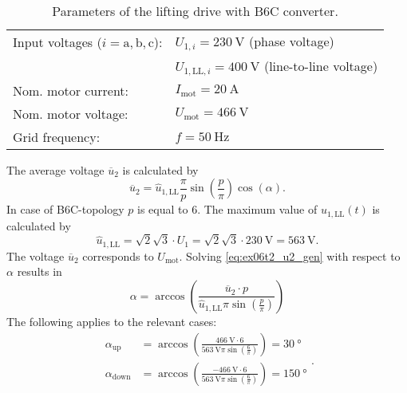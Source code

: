 \begin{table}[ht]
    \centering  %
    \begin{tabular}{ll}
        \toprule
        Input voltages ($i=\mathrm{a,b,c}$): & $U_{\mathrm{1},i}=\SI{230}{\volt}$ (phase voltage) \\
                        & $U_{\mathrm{1,LL},i} = \SI{400}{\volt}$ (line-to-line voltage)\\
        Nom. motor current: & $I_{\mathrm{mot}} = \SI{20}{\ampere}$ \\
        Nom. motor voltage: & $U_\mathrm{mot} = \SI{466}{\volt}$ \\ 
        Grid frequency: & $f= \SI{50}{\hertz}$ \\ 
        \bottomrule
    \end{tabular}
    \caption{Parameters of the lifting drive with B6C converter.}  
    \label{table:ex06_Task2_ParametersOfTheCircuit}
\end{table}


\begin{solutionblock}
    The average voltage $\overline{u}_\mathrm{2}$ is calculated by
    \begin{equation} 
        \overline{u}_\mathrm{2} = \hat{u}_\mathrm{1,LL} \frac{\pi}{p}\sin(\frac{p}{\pi}) \cos(\alpha).
        \label{eq:ex06t2_u2_gen}
    \end{equation}
    In case of B6C-topology $p$ is equal to 6. The maximum value of $u_\mathrm{1,LL}(t)$ is calculated by
    \begin{equation} 
        \hat{u}_\mathrm{1,LL}=\sqrt{2} \sqrt{3} \cdot U_\mathrm{1}= \sqrt{2} \sqrt{3} \cdot \SI{230}{\volt}=\SI{563}{\volt}.
        \label{eq:ex06t2_u1n_max}
    \end{equation}
    The voltage $\overline{u}_\mathrm{2}$ corresponds to $U_\mathrm{mot}$. Solving \eqref{eq:ex06t2_u2_gen} with respect to $\alpha$ results in
    \begin{equation} 
        \alpha = \arccos( \frac{\overline{u}_\mathrm{2} \cdot p}{\hat{u}_\mathrm{1,LL}\pi \sin(\frac{p}{\pi})})
    \end{equation}
    The following applies to the relevant cases:
    \begin{equation}     
        \begin{split}
            \alpha_\mathrm{up} &= \arccos( \frac{\SI{466}{\volt} \cdot 6}{\SI{563}{\volt}\pi \sin(\frac{6}{\pi})})=\SI{30}{\degree}     \\
            \alpha_\mathrm{down} &= \arccos( \frac{\SI{-466}{\volt} \cdot 6}{\SI{563}{\volt}\pi \sin(\frac{6}{\pi})})=\SI{150}{\degree}    \\
        \end{split}.
        \label{eq:ex06t2_alpha_gen}
    \end{equation}
\end{solutionblock}

